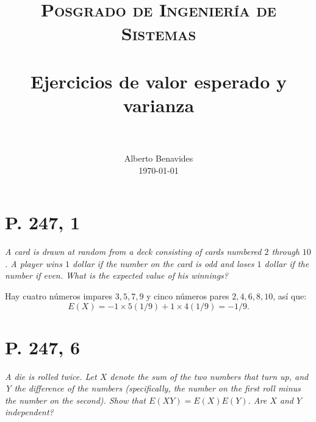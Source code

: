 \documentclass[paper=leter, fontsize=11pt]{scrartcl}
\title{
		\usefont{OT1}{bch}{b}{n}
		\normalfont \normalsize \textsc{Posgrado de Ingeniería de Sistemas} \\ [25pt]
		\horrule{0.5pt} \\[0.4cm]
		\huge Ejercicios de valor esperado y varianza \\
		\horrule{2pt} \\[0.5cm]
}
\author{
		\normalfont 								\normalsize
        Alberto Benavides\\[-3pt]		\normalsize
        \today
}
\date{}
\numberwithin{equation}{section}		%
\numberwithin{figure}{section}			%
\numberwithin{table}{section}				%
\begin{document}
 
\maketitle

\section*{P. 247, 1}
\emph{A card is drawn at random from a deck consisting of cards numbered $2$ through $10$. A player wins $1$ dollar if the number on the card is odd and loses $1$ dollar if the number if even. What is the expected value of his winnings?}

Hay cuatro números impares $3, 5, 7, 9$ y cinco números pares $2, 4, 6, 8, 10$, así que:
\begin{equation*}
    E(X) = -1 \times 5 (1/9) + 1 \times 4 (1/9) = -1/9.
\end{equation*}

\section*{P. 247, 6}
\emph{A die is rolled twice. Let $X$ denote the sum of the two numbers that turn up, and Y the difference of the numbers (specifically, the number on the first roll minus the number on the second). Show that $E(X Y) = E(X)E(Y )$. Are $X$ and $Y$ independent?}
\end{document}
